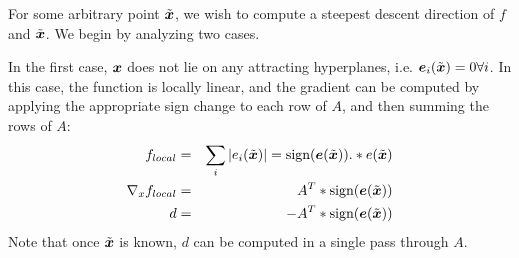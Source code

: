 \documentclass[9.5pt,journal,final,finalsubmission,twocolumn]{IEEEtran}
\begin{document}
For some arbitrary point $\tilde{{\boldsymbol{x}}}$, we wish to compute a steepest descent
direction of $f$ and $\tilde{{\boldsymbol{x}}}$.  We begin by analyzing two cases.

In the first case, ${\boldsymbol{x}}$ does not lie on any attracting hyperplanes, i.e. $\boldsymbol{e}_i(\tilde{{\boldsymbol{x}}})=0
\forall i$. In this case, the function is locally linear, and the gradient can be computed
by applying the appropriate sign change to each row of $A$, and then summing the rows of $A$:
\begin{eqnarray}
f_{local} &=& \sum_i |e_i(\tilde{{\boldsymbol{x}}})| = {\text{sign}}(\boldsymbol{e}(\tilde{{\boldsymbol{x}}})) .* e(\tilde{{\boldsymbol{x}}}) \\
\nabla_x f_{local} &=& A^T * {\text{sign}}(\boldsymbol{e}(\tilde{{\boldsymbol{x}}})) \\
d &=& -A^T * {\text{sign}}(\boldsymbol{e}(\tilde{{\boldsymbol{x}}}))
\end{eqnarray}
Note that once $\tilde{{\boldsymbol{x}}}$ is known, $d$ can be computed in a single pass through $A$.
\end{document}
